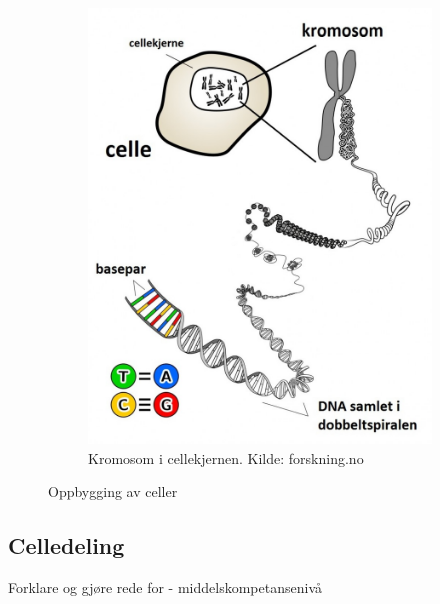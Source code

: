 \documentclass[main.tex]{subfiles}
\begin{document}
\begin{figure}[h!]
\begin{subfigure}{.5\textwidth}
    \end{subfigure}
    \begin{subfigure}{.5\textwidth}
    \centering
    \includegraphics[scale = 0.20]{../figures/dna.jpg}
    \caption{Kromosom i cellekjernen. Kilde: forskning.no}
    \end{subfigure}
    \caption{Oppbygging av celler}
    \label{fig:celler}
\end{figure}

\subsection{Celledeling}
{\color{Blue}Forklare og gjøre rede for - middelskompetansenivå}
\newline\newline
\end{document}
